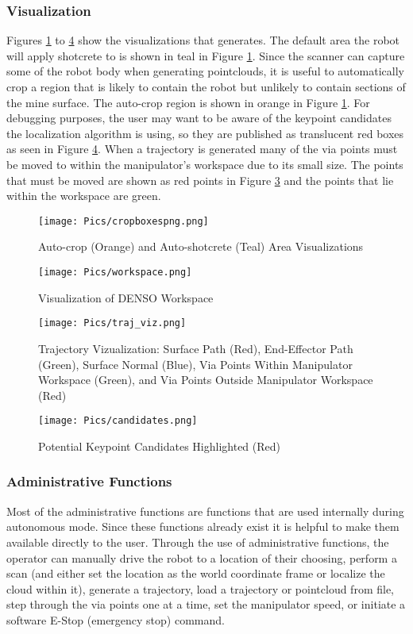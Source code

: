 \subsubsection{Visualization}
Figures \ref{fig:cropb} to \ref{fig:cands} show the visualizations that  generates. The default area the robot will apply shotcrete to is shown in teal in Figure \ref{fig:cropb}. Since the scanner can capture some of the robot body when generating pointclouds, it is useful to automatically crop a region that is likely to contain the robot but unlikely to contain sections of the mine surface. The auto-crop region is shown in orange in Figure \ref{fig:cropb}. For debugging purposes, the user may want to be aware of the keypoint candidates the localization algorithm is using, so they are published as translucent red boxes as seen in Figure \ref{fig:cands}. When a trajectory is generated many of the via points must be moved to within the manipulator's workspace due to its small size. The points that must be moved are shown as red points in Figure \ref{fig:trajviz} and the points that lie within the workspace are green.\\
\begin{figure}[h]
    \centering
    \texttt{[image: Pics/cropboxespng.png]}
    \caption{Auto-crop (Orange) and Auto-shotcrete (Teal) Area Visualizations}
    \label{fig:cropb}
\end{figure}
\begin{figure}[h]
    \centering
    \texttt{[image: Pics/workspace.png]}
    \caption{Visualization of DENSO Workspace}
    \label{fig:worksp}
\end{figure}
\begin{figure}[h]
    \centering
    \texttt{[image: Pics/traj\_viz.png]}
    \caption{Trajectory Vizualization: Surface Path (Red), End-Effector Path (Green), Surface Normal (Blue), Via Points Within Manipulator Workspace (Green), and Via Points Outside Manipulator Workspace (Red)}
    \label{fig:trajviz}
\end{figure}
\begin{figure}[h]
    \centering
    \texttt{[image: Pics/candidates.png]}
    \caption{Potential Keypoint Candidates Highlighted (Red)}
    \label{fig:cands}
\end{figure}
\subsubsection{Administrative Functions}
Most of the administrative functions are functions that are used internally during autonomous mode. Since these functions already exist it is helpful to make them available directly to the user. Through the use of administrative functions, the operator can manually drive the robot to a location of their choosing, perform a scan (and either set the location as the world coordinate frame or localize the cloud within it), generate a trajectory, load a trajectory or pointcloud from file, step through the via points one at a time, set the manipulator speed, or initiate a software E-Stop (emergency stop) command. \\

